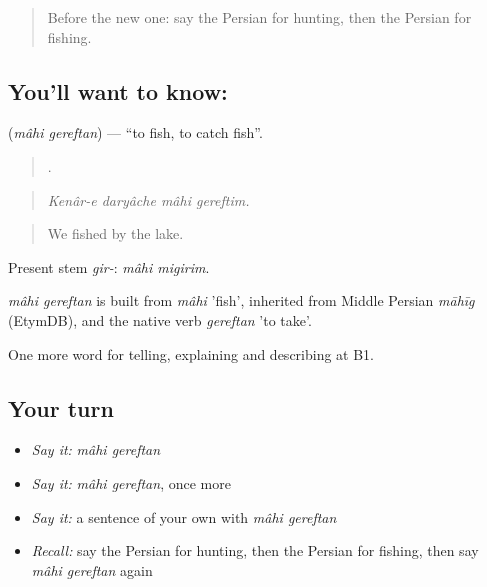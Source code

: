 \label{lesson:FA-C471-mahi-gereftan}



\begin{quote}
Before the new one: say the Persian for hunting, then the Persian for fishing.
\end{quote}

\subsection*{You'll want to know:  }
\textbf{ } (\emph{mâhi gereftan}) — \textquotedblleft{}to fish, to catch fish\textquotedblright{}.

\begin{quote}
   .
\end{quote}

\begin{quote}
\emph{Kenâr-e daryâche mâhi gereftim.}
\end{quote}

\begin{quote}
We fished by the lake.
\end{quote}

Present stem \emph{gir-}: \emph{mâhi migirim}.

\begin{cousinweb}
\emph{mâhi gereftan} is built from \emph{mâhi} 'fish', inherited from Middle Persian \emph{māhīg} (EtymDB), and the native verb \emph{gereftan} 'to take'.
\end{cousinweb}

\begin{grammarlens}[title={What you've built}]
One more word for telling, explaining and describing at B1.
\end{grammarlens}

\subsection*{Your turn}
\begin{itemize}
\raggedright
  \item \emph{Say it:} \emph{mâhi gereftan}
  \item \emph{Say it:} \emph{mâhi gereftan}, once more
  \item \emph{Say it:} a sentence of your own with \emph{mâhi gereftan}
  \item \emph{Recall:} say the Persian for hunting, then the Persian for fishing, then say \emph{mâhi gereftan} again
\end{itemize}

